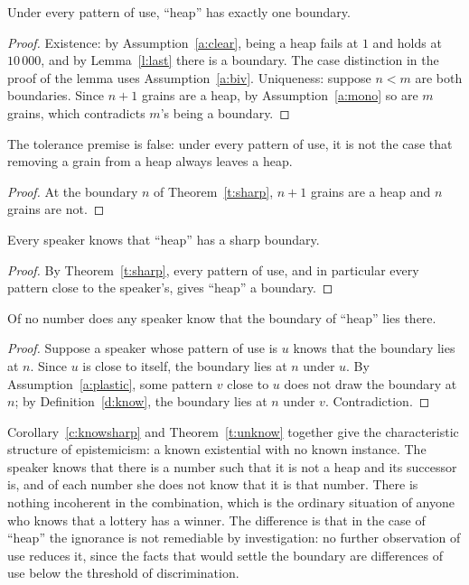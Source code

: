 \documentclass{situationist-preprint}
\begin{document}
\begin{theorem}\label{t:sharp}
Under every pattern of use, \enquote{heap} has exactly one boundary.
\end{theorem}

\begin{proof}
Existence: by Assumption~\ref{a:clear}, being a heap fails at $1$ and holds at $10\,000$, and by Lemma~\ref{l:last} there is a boundary. The case distinction in the proof of the lemma uses Assumption~\ref{a:biv}. Uniqueness: suppose $n < m$ are both boundaries. Since $n+1$ grains are a heap, by Assumption~\ref{a:mono} so are $m$ grains, which contradicts $m$'s being a boundary.
\end{proof}

\begin{theorem}\label{t:tol}
The tolerance premise is false: under every pattern of use, it is not the case that removing a grain from a heap always leaves a heap.
\end{theorem}

\begin{proof}
At the boundary $n$ of Theorem~\ref{t:sharp}, $n+1$ grains are a heap and $n$ grains are not.
\end{proof}

\begin{corollary}\label{c:knowsharp}
Every speaker knows that \enquote{heap} has a sharp boundary.
\end{corollary}

\begin{proof}
By Theorem~\ref{t:sharp}, every pattern of use, and in particular every pattern close to the speaker's, gives \enquote{heap} a boundary.
\end{proof}

\begin{theorem}[Unknowability]\label{t:unknow}
Of no number does any speaker know that the boundary of \enquote{heap} lies there.
\end{theorem}

\begin{proof}
Suppose a speaker whose pattern of use is $u$ knows that the boundary lies at $n$. Since $u$ is close to itself, the boundary lies at $n$ under $u$. By Assumption~\ref{a:plastic}, some pattern $v$ close to $u$ does not draw the boundary at $n$; by Definition~\ref{d:know}, the boundary lies at $n$ under $v$. Contradiction.
\end{proof}

Corollary~\ref{c:knowsharp} and Theorem~\ref{t:unknow} together give the characteristic structure of epistemicism: a known existential with no known instance. The speaker knows that there is a number such that it is not a heap and its successor is, and of each number she does not know that it is that number. There is nothing incoherent in the combination, which is the ordinary situation of anyone who knows that a lottery has a winner. The difference is that in the case of \enquote{heap} the ignorance is not remediable by investigation: no further observation of use reduces it, since the facts that would settle the boundary are differences of use below the threshold of discrimination.
\end{document}
